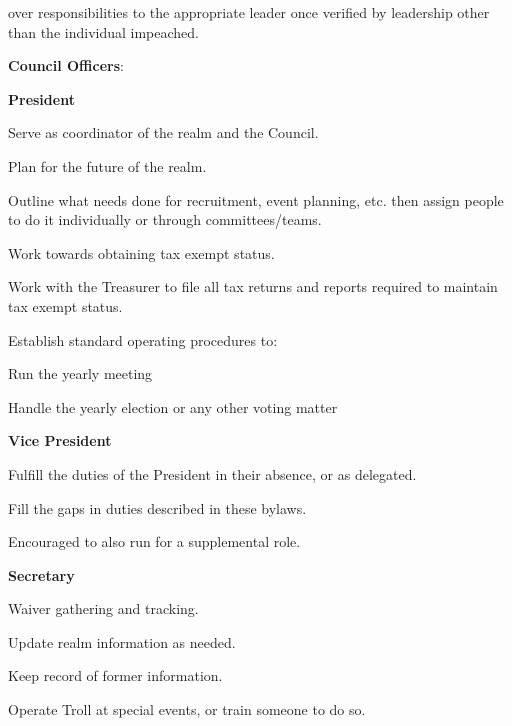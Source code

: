\documentclass[12pt]{article}
\begin{document}
\begin{level}
\begin{level}
        over responsibilities to the appropriate leader once verified by leadership other than the individual impeached.
    \end{level}
    \item \textbf{Council Officers}:
    \begin{level}
    \item \textbf{President}
        \begin{level}
            \item Serve as coordinator of the realm and the Council.
            \item Plan for the future of the realm. 
            \item Outline what needs done for recruitment, event planning, etc. then assign people to do it individually or through committees/teams.
            \item Work towards obtaining tax exempt status.
            \item Work with the Treasurer to file all tax returns and reports required to maintain tax exempt status.
            \item Establish standard operating procedures to:
            \begin{level}
                \item Run the yearly meeting
                \item Handle the yearly election or any other voting matter
            \end{level}
        \end{level}
        \item \textbf{Vice President}
        \begin{level}
            \item Fulfill the duties of the President in their absence, or as delegated.
            \item Fill the gaps in duties described in these bylaws.
            \item Encouraged to also run for a supplemental role.
        \end{level}
        \item \textbf{Secretary}
        \begin{level}
            \item Waiver gathering and tracking.
            \item Update realm information as needed.
            \item Keep record of former information.
            \item Operate Troll at special events, or train someone to do so.

\end{level}
\end{level}
\end{level}
\end{document}
